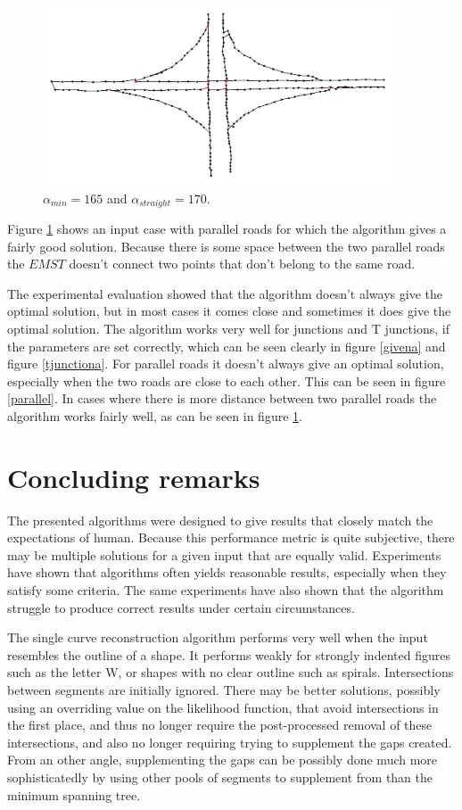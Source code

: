 \documentclass[11pt]{article}
\begin{document}
\begin{figure}[h]
  \centering
  \graphicspath{ {images/}}
  \includegraphics[width=\linewidth, height=150pt]{knooppunt167_170}
  \caption{$\alpha_{min}=165$ and $\alpha_{straight}=170$.}
  \label{knooppunt}
\end{figure}

Figure \ref{knooppunt} shows an input case with parallel roads for which the algorithm gives a fairly good solution. Because there is some space between the two parallel roads the $EMST$ doesn't connect two points that don't belong to the same road.

The experimental evaluation showed that the algorithm doesn't always give the optimal solution, but in most cases it comes close and sometimes it does give the optimal solution. The algorithm works very well for junctions and T junctions, if the parameters are set correctly, which can be seen clearly in figure \ref{givena} and figure \ref{tjunctiona}. For parallel roads it doesn't always give an optimal solution, especially when the two roads are close to each other. This can be seen in figure \ref{parallel}. In cases where there is more distance between two parallel roads the algorithm works fairly well, as can be seen in figure \ref{knooppunt}.


\section{Concluding remarks}
The presented algorithms were designed to give results that closely match the expectations of human.
Because this performance metric is quite subjective, there may be multiple solutions for a given input that are equally valid.
Experiments have shown that algorithms often yields reasonable results, especially when they satisfy some criteria. The same experiments have also shown that the algorithm struggle to produce correct results under certain circumstances.

The single curve reconstruction algorithm performs very well when the input resembles the outline of a shape.
It performs weakly for strongly indented figures such as the letter W, or shapes with no clear outline such as spirals.
Intersections between segments are initially ignored. There may be better solutions, possibly using an overriding value on the likelihood function, that avoid intersections in the first place, and thus no longer require the post-processed removal of these intersections, and also no longer requiring trying to supplement the gaps created. From an other angle, supplementing the gaps can be possibly done much more sophisticatedly by using other pools of segments to supplement from than the minimum spanning tree.
\end{document}
